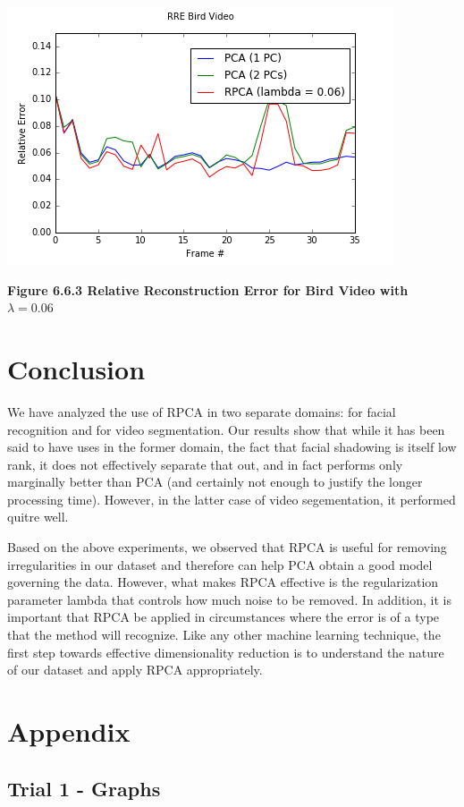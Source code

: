 \documentclass[11pt]{scrartcl} %
\theoremstyle{plain}
\begin{document}
\centerline{\includegraphics[width=\linewidth, width=100mm]{figures_video/crow/rre_006.png}}
\centerline{\textbf{Figure 6.6.3 Relative Reconstruction Error for Bird Video with $\lambda=0.06$ }}
\bigskip

\section{Conclusion}

We have analyzed the use of RPCA in two separate domains: for facial recognition and for video segmentation. Our results show that while it has been said to have uses in the former domain, the fact that facial shadowing is itself low rank, it does not effectively separate that out, and in fact performs only marginally better than PCA (and certainly not enough to justify the longer processing time). However, in the latter case of video segementation, it performed quitre well.

Based on the above experiments, we observed that RPCA is useful for removing irregularities in our dataset and therefore can help PCA obtain a good model governing the data. However, what makes RPCA effective is the regularization parameter lambda that controls how much noise to be removed. In addition, it is important that RPCA be applied in circumstances where the error is of a type that the method will recognize. Like any other machine learning technique, the first step towards effective dimensionality reduction is to understand the nature of our dataset and apply RPCA appropriately.

\newpage

\section{Appendix}

\subsection{Trial 1 - Graphs}
\end{document}
